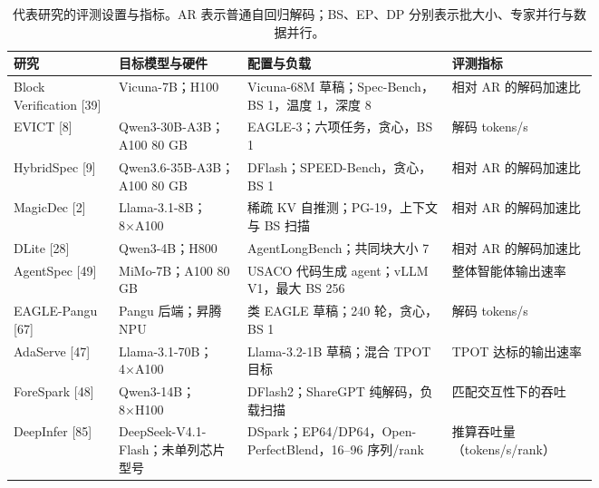 \documentclass[11pt,a4paper,UTF8,fontset=none,scheme=plain,zihao=-4]{ctexart}
\begin{document}
\begin{table}[!tbp]
\centering
\footnotesize
\setlength{\tabcolsep}{3pt}
\renewcommand{\arraystretch}{1.22}
\caption{代表研究的评测设置与指标。AR 表示普通自回归解码；BS、EP、DP 分别表示批大小、专家并行与数据并行。}\label{tbl-settings}
\begin{tabularx}{\linewidth}{@{}>{\raggedright\arraybackslash}p{0.18\linewidth}>{\raggedright\arraybackslash}p{0.22\linewidth}>{\raggedright\arraybackslash}p{0.35\linewidth}>{\raggedright\arraybackslash}X@{}}
\toprule
\textbf{研究} & \textbf{目标模型与硬件} & \textbf{配置与负载} & \textbf{评测指标} \\
\midrule
Block Verification [39] & Vicuna-7B；H100 & Vicuna-68M 草稿；Spec-Bench，BS 1，温度 1，深度 8 & 相对 AR 的解码加速比 \\
\addlinespace[2pt]
EVICT [8] & Qwen3-30B-A3B；A100 80 GB & EAGLE-3；六项任务，贪心，BS 1 & 解码 tokens/s \\
\addlinespace[2pt]
HybridSpec [9] & Qwen3.6-35B-A3B；A100 80 GB & DFlash；SPEED-Bench，贪心，BS 1 & 相对 AR 的解码加速比 \\
\addlinespace[2pt]
MagicDec [2] & Llama-3.1-8B；8×A100 & 稀疏 KV 自推测；PG-19，上下文与 BS 扫描 & 相对 AR 的解码加速比 \\
\addlinespace[2pt]
DLite [28] & Qwen3-4B；H800 & AgentLongBench；共同块大小 7 & 相对 AR 的解码加速比 \\
\addlinespace[2pt]
AgentSpec [49] & MiMo-7B；A100 80 GB & USACO 代码生成 agent；vLLM V1，最大 BS 256 & 整体智能体输出速率 \\
\addlinespace[2pt]
EAGLE-Pangu [67] & Pangu 后端；昇腾 NPU & 类 EAGLE 草稿；240 轮，贪心，BS 1 & 解码 tokens/s \\
\addlinespace[2pt]
AdaServe [47] & Llama-3.1-70B；4×A100 & Llama-3.2-1B 草稿；混合 TPOT 目标 & TPOT 达标的输出速率 \\
\addlinespace[2pt]
ForeSpark [48] & Qwen3-14B；8×H100 & DFlash2；ShareGPT 纯解码，负载扫描 & 匹配交互性下的吞吐 \\
\addlinespace[2pt]
DeepInfer [85] & DeepSeek-V4.1-Flash；未单列芯片型号 & DSpark；EP64/DP64，Open-PerfectBlend，16–96 序列/rank & 推算吞吐量（tokens/s/rank） \\
\bottomrule
\end{tabularx}
\end{table}
\end{document}
